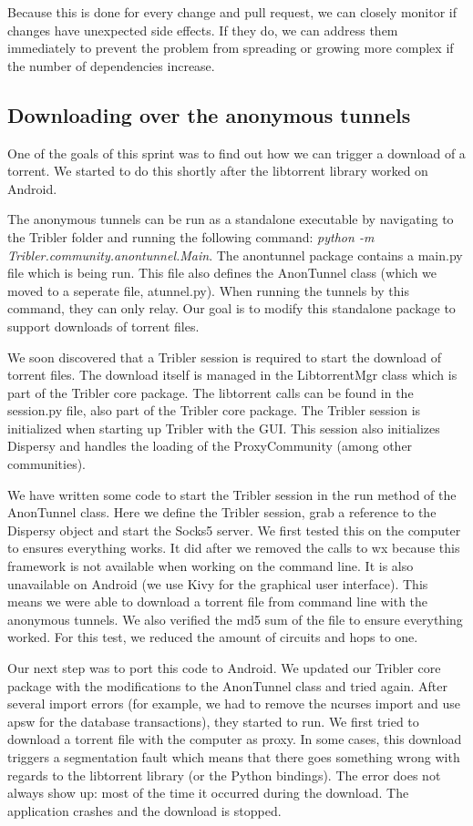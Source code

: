 		Because this is done for every change and pull request, we can closely monitor if changes have unexpected side effects. If they do, we can address them immediately to prevent the problem from spreading or growing more complex if the number of dependencies increase.
		
	\subsection{Downloading over the anonymous tunnels}
	One of the goals of this sprint was to find out how we can trigger a download of a torrent. We started to do this shortly after the libtorrent library worked on Android.
	
	The anonymous tunnels can be run as a standalone executable by navigating to the Tribler folder and running the following command: \emph{python -m Tribler.community.anontunnel.Main}. The anontunnel package contains a main.py file which is being run. This file also defines the AnonTunnel class (which we moved to a seperate file, atunnel.py). When running the tunnels by this command, they can only relay. Our goal is to modify this standalone package to support downloads of torrent files.
	
	We soon discovered that a Tribler session is required to start the download of torrent files. The download itself is managed in the LibtorrentMgr class which is part of the Tribler core package. The libtorrent calls can be found in the session.py file, also part of the Tribler core package. The Tribler session is initialized when starting up Tribler with the GUI. This session also initializes Dispersy and handles the loading of the ProxyCommunity (among other communities).
	
	We have written some code to start the Tribler session in the run method of the AnonTunnel class. Here we define the Tribler session, grab a reference to the Dispersy object and start the Socks5 server. We first tested this on the computer to ensures everything works. It did after we removed the calls to wx because this framework is not available when working on the command line. It is also unavailable on Android (we use Kivy for the graphical user interface). This means we were able to download a torrent file from command line with the anonymous tunnels. We also verified the md5 sum of the file to ensure everything worked. For this test, we reduced the amount of circuits and hops to one.
	
	Our next step was to port this code to Android. We updated our Tribler core package with the modifications to the AnonTunnel class and tried again. After several import errors (for example, we had to remove the ncurses import and use apsw for the database transactions), they started to run. We first tried to download a torrent file with the computer as proxy. In some cases, this download triggers a segmentation fault which means that there goes something wrong with regards to the libtorrent library (or the Python bindings). The error does not always show up: most of the time it occurred during the download. The application crashes and the download is stopped.
	
